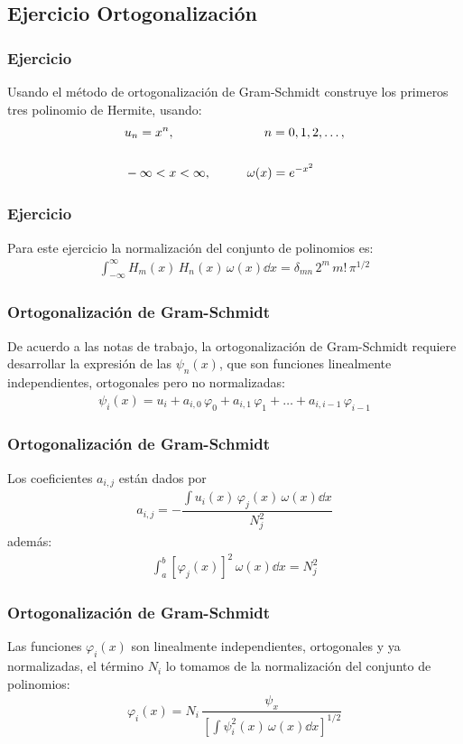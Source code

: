 \subsection{Ejercicio Ortogonalización}
\begin{frame}
\frametitle{Ejercicio}
Usando el método de ortogonalización de Gram-Schmidt construye los primeros tres polinomio de Hermite, usando:
\begin{align*}
&u_{n} = x^{n}, \hspace{2.5cm} n = 0, 1, 2, \ldots, \\[0.5cm]
&-\infty < x < \infty, \hspace{1cm} \omega(x) = e^{-x^{2}}
\end{align*}
\end{frame}
\begin{frame}
\frametitle{Ejercicio}
Para este ejercicio la normalización del conjunto de polinomios es:
\begin{align*}
\int_{-\infty}^{\infty} H_{m} (x) \, H_{n} (x) \, \omega (x) \dd{x} = \delta_{mn} \, 2^{m} \, m! \, \pi^{1/2}
\end{align*}
\end{frame}
\begin{frame}
\frametitle{Ortogonalización de Gram-Schmidt}
De acuerdo a las notas de trabajo, la ortogonalización de Gram-Schmidt requiere desarrollar la expresión de las $\psi_{n} (x)$, que son funciones linealmente independientes, ortogonales pero no normalizadas:
\begin{align*}
\psi_{i} (x) = u_{i} + a_{i,0} \, \varphi_{0} + a_{i,1} \, \varphi_{1} + \ldots + a_{i,i-1} \, \varphi_{i-1} 
\end{align*}
\end{frame}
\begin{frame}
\frametitle{Ortogonalización de Gram-Schmidt}
Los coeficientes $a_{i, j}$ están dados por
\begin{align*}
a_{i,j} = - \dfrac{\displaystyle \int u_{i}(x) \, \varphi_{j} (x) \, \omega (x) \dd{x}}{N_{j}^{2}}
\end{align*}
además:
\begin{align*}
\int_{a}^{b} \left[ \varphi_{j} (x) \right]^{2} \, \omega (x) \dd{x} = N_{j}^{2}
\end{align*}
\end{frame}
\begin{frame}
\frametitle{Ortogonalización de Gram-Schmidt}
Las funciones $\varphi_{i}(x)$ son linealmente independientes, ortogonales y ya normalizadas, el término $N_{i}$ lo tomamos de la normalización del conjunto de polinomios:
\begin{align*}
\varphi_{i} (x) = N_{i} \, \dfrac{\psi_{x}}{\left[ \displaystyle \int \psi_{i}^{2} (x) \, \omega (x) \dd{x} \right]^{1/2}}
\end{align*}
\end{frame}

